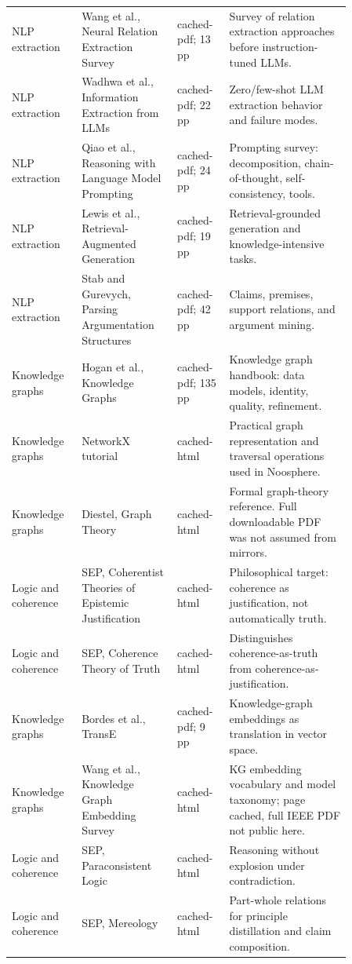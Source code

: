 \documentclass[11pt]{article}
\begin{document}
\begin{longtable}{p{0.16\linewidth}p{0.25\linewidth}p{0.13\linewidth}p{0.32\linewidth}}
NLP extraction & Wang et al., Neural Relation Extraction Survey & cached-pdf; 13 pp & Survey of relation extraction approaches before instruction-tuned LLMs. \\
NLP extraction & Wadhwa et al., Information Extraction from LLMs & cached-pdf; 22 pp & Zero/few-shot LLM extraction behavior and failure modes. \\
NLP extraction & Qiao et al., Reasoning with Language Model Prompting & cached-pdf; 24 pp & Prompting survey: decomposition, chain-of-thought, self-consistency, tools. \\
NLP extraction & Lewis et al., Retrieval-Augmented Generation & cached-pdf; 19 pp & Retrieval-grounded generation and knowledge-intensive tasks. \\
NLP extraction & Stab and Gurevych, Parsing Argumentation Structures & cached-pdf; 42 pp & Claims, premises, support relations, and argument mining. \\
Knowledge graphs & Hogan et al., Knowledge Graphs & cached-pdf; 135 pp & Knowledge graph handbook: data models, identity, quality, refinement. \\
Knowledge graphs & NetworkX tutorial & cached-html & Practical graph representation and traversal operations used in Noosphere. \\
Knowledge graphs & Diestel, Graph Theory & cached-html & Formal graph-theory reference. Full downloadable PDF was not assumed from mirrors. \\
Logic and coherence & SEP, Coherentist Theories of Epistemic Justification & cached-html & Philosophical target: coherence as justification, not automatically truth. \\
Logic and coherence & SEP, Coherence Theory of Truth & cached-html & Distinguishes coherence-as-truth from coherence-as-justification. \\
Knowledge graphs & Bordes et al., TransE & cached-pdf; 9 pp & Knowledge-graph embeddings as translation in vector space. \\
Knowledge graphs & Wang et al., Knowledge Graph Embedding Survey & cached-html & KG embedding vocabulary and model taxonomy; page cached, full IEEE PDF not public here. \\
Logic and coherence & SEP, Paraconsistent Logic & cached-html & Reasoning without explosion under contradiction. \\
Logic and coherence & SEP, Mereology & cached-html & Part-whole relations for principle distillation and claim composition. \\

\end{longtable}
\end{document}
